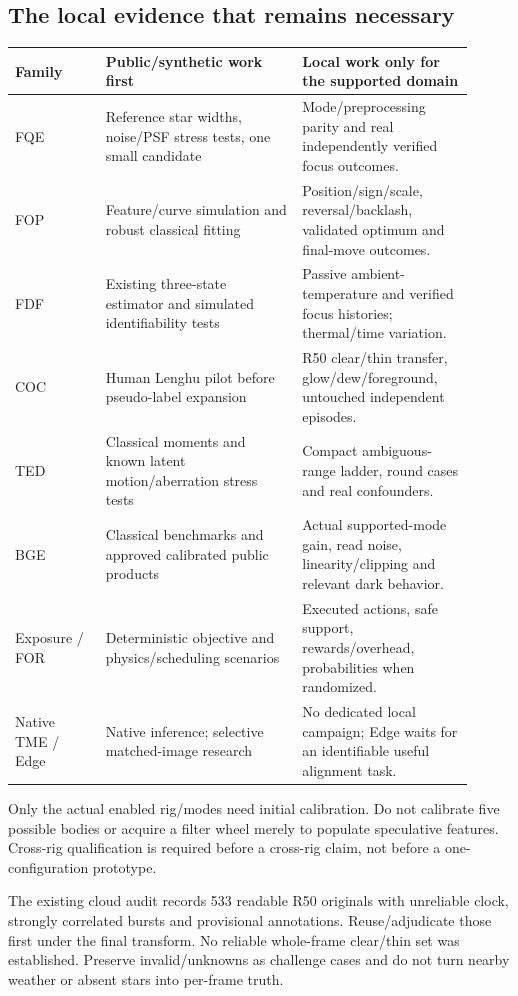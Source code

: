 \documentclass[11pt,a4paper]{article}
\begin{document}
\subsection{The local evidence that remains necessary}
\begin{longtable}{@{}L{0.18\linewidth}L{0.39\linewidth}L{0.34\linewidth}@{}}
\toprule Family & Public/synthetic work first & Local work only for the supported domain\\\midrule\endhead
FQE & Reference star widths, noise/PSF stress tests, one small candidate &
Mode/preprocessing parity and real independently verified focus outcomes.\\
FOP & Feature/curve simulation and robust classical fitting &
Position/sign/scale, reversal/backlash, validated optimum and final-move outcomes.\\
FDF & Existing three-state estimator and simulated identifiability tests &
Passive ambient-temperature and verified focus histories; thermal/time variation.\\
COC & Human Lenghu pilot before pseudo-label expansion &
R50 clear/thin transfer, glow/dew/foreground, untouched independent episodes.\\
TED & Classical moments and known latent motion/aberration stress tests &
Compact ambiguous-range ladder, round cases and real confounders.\\
BGE & Classical benchmarks and approved calibrated public products &
Actual supported-mode gain, read noise, linearity/clipping and relevant dark behavior.\\
Exposure / FOR & Deterministic objective and physics/scheduling scenarios &
Executed actions, safe support, rewards/overhead, probabilities when randomized.\\
Native TME / Edge & Native inference; selective matched-image research &
No dedicated local campaign; Edge waits for an identifiable useful alignment task.\\
\bottomrule
\end{longtable}
Only the actual enabled rig/modes need initial calibration. Do not calibrate
five possible bodies or acquire a filter wheel merely to populate speculative
features. Cross-rig qualification is required before a cross-rig claim, not
before a one-configuration prototype.

The existing cloud audit records 533 readable R50 originals with unreliable
clock, strongly correlated bursts and provisional annotations. Reuse/adjudicate
those first under the final transform. No reliable whole-frame clear/thin set
was established. Preserve invalid/unknowns as challenge cases and do not turn
nearby weather or absent stars into per-frame truth.
\end{document}
